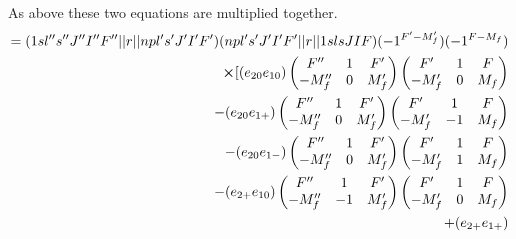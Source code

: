 As above these two equations are multiplied together.
\begin{align}
    \begin{split}
            =(1sl'' s'' J'' I'' F''\abs{\abs{r}}npl's'J'I'F')
            (npl' s' J' I' F'\abs{\abs{r}}1s lsJIF)
            (-1^{F'-M_f'})(-1^{F-M_f})\\
            \cross
            [
            (e_{20}e_{10})
            \begin{pmatrix}
             F''    & 1 & F'\\
            -M_f'' & 0 &M_f'
            \end{pmatrix}
            \begin{pmatrix}
            F'    & 1 & F\\
            -M_f' & 0 &M_f
            \end{pmatrix}\\
            -
            (e_{20}e_{1+})
            \begin{pmatrix}
             F''    & 1 & F'\\
            -M_f'' & 0 &M_f'
            \end{pmatrix}
            \begin{pmatrix}
            F'    & 1 & F\\
            -M_f' & -1 &M_f
            \end{pmatrix}\\
            -
            (e_{20}e_{1-})
            \begin{pmatrix}
             F''    & 1 & F'\\
            -M_f'' & 0 &M_f'
            \end{pmatrix}
            \begin{pmatrix}
            F'    & 1 & F\\
            -M_f' & 1 &M_f
            \end{pmatrix}\\
            -
            (e_{2+}e_{10})
            \begin{pmatrix}
             F''    & 1 & F'\\
            -M_f'' & -1 &M_f'
            \end{pmatrix}
            \begin{pmatrix}
            F'    & 1 & F\\
            -M_f' & 0 &M_f
            \end{pmatrix}\\
            +
            (e_{2+}e_{1+})

\end{split}
\end{align}
